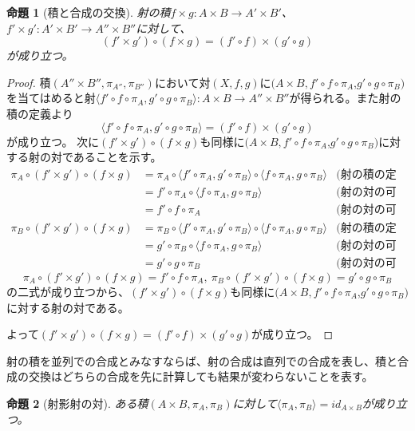 \documentclass[dvipdfmx]{jsarticle}
\newcommand{\arrow}{\rightarrow}
\newcommand{\tuple}[1]{\langle #1\rangle}
\newcommand{\mor}[3]{#1:#2\arrow #3}
\newtheorem{proof}{証明}[section]
\newtheorem{prop}{命題}[section]
\numberwithin{proof}{subsection}
\numberwithin{prop}{subsection}
\numberwithin{define}{subsection}
\begin{document}
	\begin{prop}[積と合成の交換]
		射の積$\mor{f\times g}{A\times B}{A'\times B'}$、$\mor{f'\times g'}{A'\times B'}{A''\times B''}$に対して、\[(f'\times g')\circ(f\times g)=(f'\circ f)\times(g'\circ g)\]が成り立つ。
	\end{prop}
	\begin{proof}
		積$(A''\times B'',\pi_{A''},\pi_{B''})$において対$(X,f,g)$に$(A\times B,f'\circ f\circ\pi_A$,$g'\circ g\circ\pi_B)$を当てはめると射$\mor{\tuple{f'\circ f\circ\pi_A,g'\circ g\circ\pi_B}}{A\times B}{A''\times B''}$が得られる。また射の積の定義より\[\tuple{f'\circ f\circ\pi_A,g'\circ g\circ\pi_B}=(f'\circ f)\times(g'\circ g)\]が成り立つ。
		次に$(f'\times g')\circ(f\times g)$も同様に$(A\times B,f'\circ f\circ\pi_A$,$g'\circ g\circ\pi_B)$に対する射の対であることを示す。
		\begin{align*}
			\pi_A\circ(f'\times g')\circ(f\times g)&=\pi_A\circ\tuple{f'\circ\pi_A,g'\circ\pi_B}\circ\tuple{f\circ\pi_A,g\circ\pi_B}&\text{(射の積の定義)}\\
			&=f'\circ\pi_A\circ\tuple{f\circ\pi_A,g\circ\pi_B}&\text{(射の対の可換性)}\\
			&=f'\circ f\circ\pi_A&\text{(射の対の可換性)}\\
			\pi_B\circ(f'\times g')\circ(f\times g)&=\pi_B\circ\tuple{f'\circ\pi_A,g'\circ\pi_B}\circ\tuple{f\circ\pi_A,g\circ\pi_B}&\text{(射の積の定義)}\\
			&=g'\circ\pi_B\circ\tuple{f\circ\pi_A,g\circ\pi_B}&\text{(射の対の可換性)}\\
			&=g'\circ g\circ\pi_B&\text{(射の対の可換性)}
		\end{align*}
		\[\pi_A\circ(f'\times g')\circ(f\times g)=f'\circ f\circ\pi_A,\ \pi_B\circ(f'\times g')\circ(f\times g)=g'\circ g\circ\pi_B\]の二式が成り立つから、$(f'\times g')\circ(f\times g)$も同様に$(A\times B,f'\circ f\circ\pi_A$,$g'\circ g\circ\pi_B)$に対する射の対である。

		よって$(f'\times g')\circ(f\times g)=(f'\circ f)\times(g'\circ g)$が成り立つ。
	\end{proof}
	射の積を並列での合成とみなすならば、射の合成は直列での合成を表し、積と合成の交換はどちらの合成を先に計算しても結果が変わらないことを表す。
	\begin{prop}[射影射の対]
		ある積$(A\times B,\pi_A,\pi_B)$に対して$\tuple{\pi_A,\pi_B}=id_{A\times B}$が成り立つ。
	\end{prop}
\end{document}
